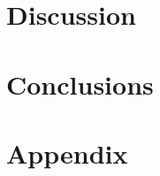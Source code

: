 \documentclass[a4paper]{article}
\begin{document}


\section{Discussion}



\section{Conclusions}



\printbibliography

\pagebreak  
{}
\recalctypearea    
\section{Appendix}

\end{document}
